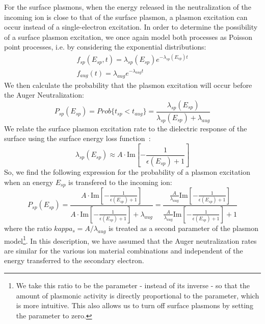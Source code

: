 \begin{refsection}
For the surface plasmons, when the energy released in the neutralization of the incoming ion is close to that of the surface plasmon, a plasmon excitation can occur instead of a single-electron excitation. In order to determine the possibility of a surface plasmon excitation, we once again model both processes as Poisson point processes, i.e. by considering the exponential distributions:
\begin{eqnarray}
f_{sp}(E_{sp}, t) = \lambda_{sp} (E_{sp}) e^{-\lambda_{sp}(E_{sp}) t}\\
f_{aug}(t) = \lambda_{aug} e^{-\lambda_{aug} t}
\end{eqnarray}
We then calculate the probability that the plasmon excitation will occur before the Auger Neutralization:
\begin{equation}
P_{sp}(E_{sp}) = Prob\{t_{sp} < t_{aug}\} = \frac{\lambda_{sp}(E_{sp})}{\lambda_{sp}(E_{sp}) + \lambda_{aug}}
\end{equation}
We relate the surface plasmon excitation rate to the dielectric response of the surface using the surface energy loss function~\cite{Raether1980}:
\begin{equation}
\lambda_{sp}(E_{sp}) \approx A \cdot \text{Im}\left[-\frac{1}{\epsilon(E_{sp}) + 1}\right]
\end{equation}
So, we find the following expression for the probability of a plasmon excitation when an energy $E_{sp}$ is transfered to the incoming ion:
\begin{equation}
P_{sp}(E_{sp}) = \frac{A\cdot \text{Im}\left[-\frac{1}{\epsilon(E_{sp}) + 1}\right]}{A \cdot \text{Im}\left[-\frac{1}{\epsilon(E_{sp}) + 1}\right] + \lambda_{aug}} = \frac{ \frac{A}{\lambda_{aug}} \text{Im}\left[-\frac{1}{\epsilon(E_{sp}) + 1}\right]}{\frac{A}{\lambda_{aug}} \text{Im}\left[-\frac{1}{\epsilon(E_{sp}) + 1}\right] + 1}
\end{equation}
where the ratio $kappa_s = A/\lambda_{aug}$ is treated as a second parameter of the plasmon model\footnote{We take this ratio to be the parameter - instead of its inverse - so that the amount of plasmonic activity is directly proportional to the parameter, which is more intuitive. This also allows us to turn off surface plasmons by setting the parameter to zero.}. In this description, we have assumed that the Auger neutralization rates are similar for the various ion material combinations and independent of the energy transferred to the secondary electron.



\end{refsection}
